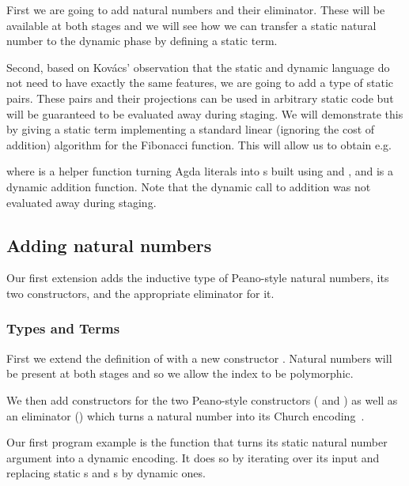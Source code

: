 First we are going to add natural numbers and their eliminator.
These will be available at both stages and we will see how we
can transfer a static natural number to the dynamic phase by
defining a static  term.

Second, based on Kov{\'{a}}cs' observation that the static and
dynamic language do not need to have exactly the same features,
we are going to add a type of static pairs.
%
These pairs and their projections can be used in arbitrary static
code but will be guaranteed to be evaluated away during staging.
%
We will demonstrate this by giving a static term 
implementing a standard linear (ignoring the cost of addition)
algorithm for the Fibonacci function.
%
This will allow us to obtain e.g.


\noindent where  is a helper function turning Agda
literals into s built using  and ,
and  is a dynamic addition function.
%
Note that the dynamic call to addition was not evaluated
away during staging.

\subsection{Adding natural numbers}

Our first extension adds the inductive type of Peano-style natural numbers,
its two constructors, and the appropriate eliminator for it.

\subsubsection{Types and Terms}

First we extend the definition of  with a new constructor
. Natural numbers will be present at both stages and so we
allow the index to be polymorphic.


We then add  constructors for the two Peano-style
constructors ( and ) as well as an
eliminator () which turns a natural number into
its Church encoding~\cite[Chapter 3]{church1941calculi}.


Our first program example is the function  that
turns its static natural number argument into a dynamic
encoding. It does so by iterating over its input and replacing
static s and s by dynamic ones.

